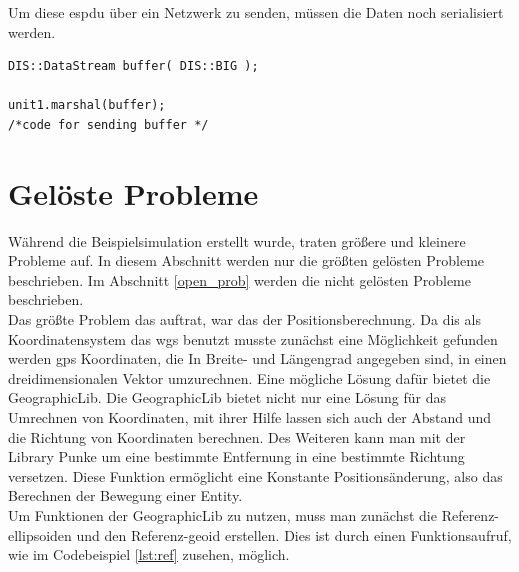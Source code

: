 Um  diese \ac{espdu} über ein Netzwerk zu senden, müssen die Daten noch serialisiert werden.   
\begin{lstlisting}[caption = Serialisieren der Entity,label={lst:marshal}]
DIS::DataStream buffer( DIS::BIG );

unit1.marshal(buffer);
/*code for sending buffer */
\end{lstlisting}
\newpage
\section{Gelöste Probleme}\label{gelös_probl}
Während die Beispielsimulation erstellt wurde, traten größere und kleinere Probleme auf. In diesem Abschnitt werden nur die größten gelösten Probleme beschrieben. Im Abschnitt \ref{open_prob} werden die nicht gelösten Probleme beschrieben.\\
Das größte Problem das auftrat, war das der Positionsberechnung. Da \ac{dis} als Koordinatensystem das \ac{wgs} benutzt musste zunächst eine Möglichkeit gefunden werden \ac{gps} Koordinaten, die In Breite- und Längengrad angegeben sind, in einen dreidimensionalen Vektor umzurechnen.
Eine mögliche Lösung dafür bietet die \glqq GeographicLib\grqq{}.
Die \glqq GeographicLib\grqq{} bietet nicht nur eine Lösung für das Umrechnen von Koordinaten, mit ihrer Hilfe lassen sich auch der Abstand und die Richtung von Koordinaten berechnen. Des Weiteren kann man mit der Library Punke um eine bestimmte Entfernung in eine bestimmte Richtung versetzen. Diese Funktion ermöglicht eine Konstante Positionsänderung, also das Berechnen der Bewegung einer Entity. \\
Um Funktionen der \glqq GeographicLib\grqq{} zu nutzen, muss man zunächst die Referenz-ellipsoiden und den Referenz-geoid erstellen. 
Dies ist durch einen Funktionsaufruf, wie im Codebeispiel \ref{lst:ref} zusehen, möglich.

